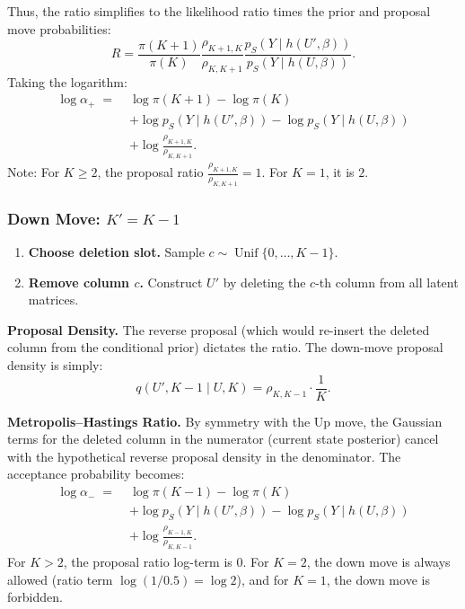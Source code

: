 \documentclass{article}
\theoremstyle{plain}
\theoremstyle{definition}
\theoremstyle{remark}
\begin{document}
Thus, the ratio simplifies to the likelihood ratio times the prior and proposal move probabilities:
\[
  R = \frac{\pi(K+1)}{\pi(K)} \frac{\rho_{K+1,K}}{\rho_{K,K+1}} \frac{p_S(Y \mid h(U',\beta))}{p_S(Y \mid h(U,\beta))}.
\]
Taking the logarithm:
\begin{equation}
\boxed{
\begin{aligned}
  \log \alpha_{+} \;=\; & \log \pi(K+1) - \log \pi(K) \\
  & + \log p_S(Y \mid h(U',\beta)) - \log p_S(Y \mid h(U,\beta)) \\
  & + \log \frac{\rho_{K+1,K}}{\rho_{K,K+1}}.
\end{aligned}
}
\end{equation}
Note: For $K \ge 2$, the proposal ratio $\frac{\rho_{K+1,K}}{\rho_{K,K+1}} = 1$. For $K=1$, it is $2$.

\subsubsection{Down Move: \(K' = K-1\)}

\begin{enumerate}
    \item \textbf{Choose deletion slot.} Sample $c \sim \operatorname{Unif}\{0,\dots,K-1\}$.
    \item \textbf{Remove column $c$.} Construct $U'$ by deleting the $c$-th column from all latent matrices.
\end{enumerate}

\noindent \textbf{Proposal Density.}
The reverse proposal (which would re-insert the deleted column from the conditional prior) dictates the ratio. The down-move proposal density is simply:
\[
  q(U', K-1 \mid U, K) = \rho_{K,K-1} \cdot \frac{1}{K}.
\]

\noindent \textbf{Metropolis--Hastings Ratio.}
By symmetry with the Up move, the Gaussian terms for the deleted column in the numerator (current state posterior) cancel with the hypothetical reverse proposal density in the denominator. The acceptance probability becomes:
\begin{equation}
\boxed{
\begin{aligned}
  \log \alpha_{-} \;=\; & \log \pi(K-1) - \log \pi(K) \\
  & + \log p_S(Y \mid h(U',\beta)) - \log p_S(Y \mid h(U,\beta)) \\
  & + \log \frac{\rho_{K-1,K}}{\rho_{K,K-1}}.
\end{aligned}
}
\end{equation}
For $K > 2$, the proposal ratio log-term is 0. For $K=2$, the down move is always allowed (ratio term $\log(1/0.5) = \log 2$), and for $K=1$, the down move is forbidden.
\end{document}
